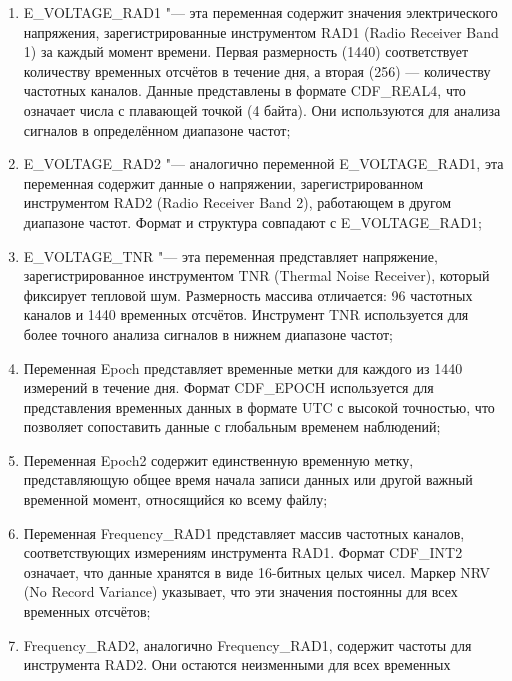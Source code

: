 \documentclass[spec, och, diploma]{SCWorks}
\begin{document}
        \begin{enumerate}
            \item E_VOLTAGE_RAD1 "--- эта переменная содержит значения
            электрического напряжения, зарегистрированные инструментом RAD1
            (Radio Receiver Band 1) за каждый момент времени. Первая размерность
            (1440) соответствует количеству временных отсчётов в течение дня, а
            вторая (256) — количеству частотных каналов. Данные представлены в
            формате CDF_REAL4, что означает числа с плавающей точкой (4 байта).
            Они используются для анализа сигналов в определённом диапазоне
            частот;
            \item E_VOLTAGE_RAD2 "--- аналогично переменной E_VOLTAGE_RAD1, эта
            переменная содержит данные о напряжении, зарегистрированном
            инструментом RAD2 (Radio Receiver Band 2), работающем в другом
            диапазоне частот. Формат и структура совпадают с E_VOLTAGE_RAD1;
            \item E_VOLTAGE_TNR "--- эта переменная представляет напряжение,
            зарегистрированное инструментом TNR (Thermal Noise Receiver),
            который фиксирует тепловой шум. Размерность массива отличается: 96
            частотных каналов и 1440 временных отсчётов. Инструмент TNR
            используется для более точного анализа сигналов в нижнем диапазоне
            частот;
            \item Переменная Epoch представляет временные метки для каждого из
            1440 измерений в течение дня. Формат CDF_EPOCH используется для
            представления временных данных в формате UTC с высокой точностью,
            что позволяет сопоставить данные с глобальным временем наблюдений;
            \item Переменная Epoch2 содержит единственную временную метку,
            представляющую общее время начала записи данных или другой важный
            временной момент, относящийся ко всему файлу;
            \item Переменная Frequency_RAD1 представляет массив частотных
            каналов, соответствующих измерениям инструмента RAD1. Формат
            CDF_INT2 означает, что данные хранятся в виде 16-битных целых чисел.
            Маркер NRV (No Record Variance) указывает, что эти значения
            постоянны для всех временных отсчётов;
            \item Frequency_RAD2, аналогично Frequency_RAD1, содержит частоты
            для инструмента RAD2. Они остаются неизменными для всех временных

\end{enumerate}
\end{document}
